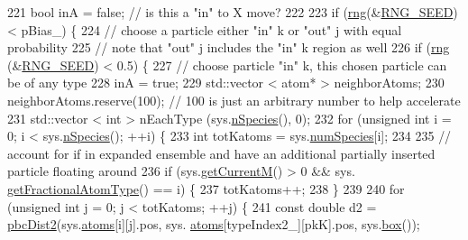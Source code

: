 \begin{DoxyCode}
221         \textcolor{keywordtype}{bool} inA = \textcolor{keyword}{false}; \textcolor{comment}{// is this a "in" to X move?}
222 
223         \textcolor{keywordflow}{if} (\hyperlink{utilities_8cpp_a0f9542af4b475ac79cb679d7a8d14db0}{rng}(&\hyperlink{global_8h_a3f4e4ea24d5a5c66feae55d1f329c884}{RNG\_SEED}) < pBias\_) \{
224             \textcolor{comment}{// choose a particle either "in" k or "out" j with equal probability}
225             \textcolor{comment}{// note that "out" j includes the "in" k region as well}
226             \textcolor{keywordflow}{if} (\hyperlink{utilities_8cpp_a0f9542af4b475ac79cb679d7a8d14db0}{rng} (&\hyperlink{global_8h_a3f4e4ea24d5a5c66feae55d1f329c884}{RNG\_SEED}) < 0.5) \{
227                     \textcolor{comment}{// choose particle "in" k, this chosen particle can be of any type}
228                     inA = \textcolor{keyword}{true};
229             std::vector < atom* > neighborAtoms;
230                     neighborAtoms.reserve(100); \textcolor{comment}{// 100 is just an arbitrary number to help accelerate}
231                     std::vector < int > nEachType (sys.\hyperlink{classsim_system_ab5e2e9b6204de15520302fe1d51688dd}{nSpecies}(), 0);
232                     \textcolor{keywordflow}{for} (\textcolor{keywordtype}{unsigned} \textcolor{keywordtype}{int} i = 0; i < sys.\hyperlink{classsim_system_ab5e2e9b6204de15520302fe1d51688dd}{nSpecies}(); ++i) \{
233                         \textcolor{keywordtype}{int} totKatoms = sys.\hyperlink{classsim_system_a9eea865e6dc1cff377b1e79c4d9c23f0}{numSpecies}[i];
234 
235                         \textcolor{comment}{// account for if in expanded ensemble and have an additional partially inserted
       particle floating around}
236                         \textcolor{keywordflow}{if} (sys.\hyperlink{classsim_system_a299fe4372e610b554eaaf5f5957b2dbc}{getCurrentM}() > 0 && sys.
      \hyperlink{classsim_system_a0500a9e84eecfbde7a98cf8a34f719d5}{getFractionalAtomType}() == i) \{
237                                 totKatoms++;
238                         \}
239 
240                         \textcolor{keywordflow}{for} (\textcolor{keywordtype}{unsigned} \textcolor{keywordtype}{int} j = 0; j < totKatoms; ++j) \{
241                     \textcolor{keyword}{const} \textcolor{keywordtype}{double} d2 = \hyperlink{utilities_8cpp_abb1db3a8a3ac46e044bbe7b2c5684c0a}{pbcDist2}(sys.\hyperlink{classsim_system_a90421b19082f7fb8fc23b7264b1161e4}{atoms}[i][j].pos, sys.
      \hyperlink{classsim_system_a90421b19082f7fb8fc23b7264b1161e4}{atoms}[typeIndex2\_][pkK].pos, sys.\hyperlink{classsim_system_a8bff9dfb95b1b09a0fab2c1c485ade07}{box}());

\end{DoxyCode}
